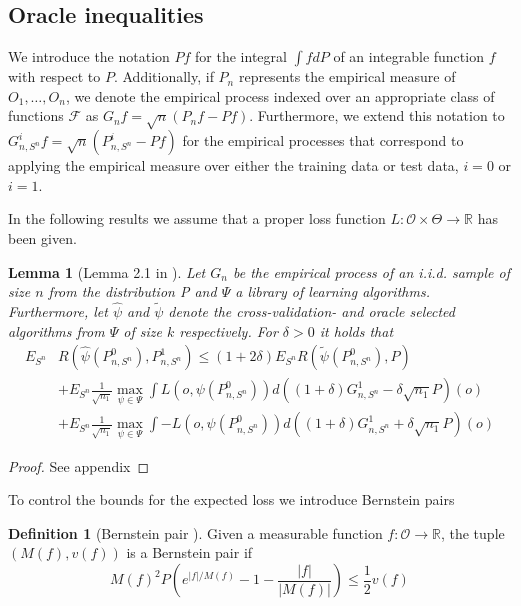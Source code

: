 \documentclass[11pt, a4paper]{article}
\newtheorem{lemma}[theorem]{Lemma}
\theoremstyle{definition}
\newtheorem{definition}[theorem]{Definition}
\theoremstyle{remark}
\newcommand{\ml}{k}
\newcommand{\la}{\psi}
\newcommand{\Sn}{S^n}
\newcommand{\lib}{\Psi}
\begin{document}
\subsection{Oracle inequalities}
We introduce the notation $Pf$ for the integral $\int f dP$ of an integrable function $f$ with respect to $P$. Additionally, if $P_n$ represents the empirical measure of $O_1, \dots, O_n$, we denote the empirical process indexed over an appropriate class of functions $\mathcal{F}$ as $G_n f = \sqrt{n}(P_n f - P f)$. Furthermore, we extend this notation to $G_{n, \Sn}^{i} f = \sqrt{n}(P_{n, \Sn}^{i} - Pf)$ for the empirical processes that correspond to applying the empirical measure over either the training data or test data, $ i = 0 $ or $ i = 1 $.

In the following results we assume that a proper loss function $ L: \mathcal{O} \times \Theta \to \mathbb{R} $ has been given.  
\begin{lemma}[Lemma 2.1 in \parencite{vaart06}] \label{finitesampledecomp}
    Let $ G_{n} $ be the empirical process of an i.i.d. sample of size $ n $ from the distribution P and $ \lib$ a library of learning algorithms. Furthermore, let $ \hat{\la}  $ and $ \tilde{\la} $ denote the cross-validation- and oracle selected algorithms from $ \lib $ of size $ \ml $ respectively. For $ \delta > 0 $ it holds that
   \begin{align*}
       E_{\Sn} &R( \hat{\la}(P_{n, \Sn}^{0} ), P_{n, \Sn}^{1}) \leq (1 + 2 \delta) E_{\Sn} R( \tilde{\la}(P_{n, \Sn}^{0}) , P ) \\ 
                                                                &+E_{\Sn} \frac{1}{\sqrt{n_1} } \max_{\la \in \lib} \int L(o, \la(P_{n, \Sn}^{0})) d ((1 + \delta) G_{n,\Sn}^{1} - \delta \sqrt{n_1} P)(o)  \\
                                                                &+E_{\Sn} \frac{1}{\sqrt{n_1} } \max_{\la \in \lib} \int-L(o, \la(P_{n, \Sn}^{0})) d ((1 + \delta) G_{n,\Sn}^{1} + \delta \sqrt{n_1} P)(o)  
   \end{align*}
\end{lemma}
\begin{proof}
    See appendix
\end{proof}
To control the bounds for the expected loss we introduce Bernstein pairs 
\begin{definition}[Bernstein pair \parencite{vaart06}]
    Given a measurable function $ f: \mathcal{O} \to \mathbb{R} $, the tuple $ (M(f) , v(f)) $ is a Bernstein pair if 
    \begin{equation} \label{bernstein}
        M(f)^2 P\left( e^{|f|/M(f)} -1 - \frac{|f|}{|M(f)|}\right) \leq \frac{1}{2}v(f) 
    \end{equation}
\end{definition}
\end{document}
